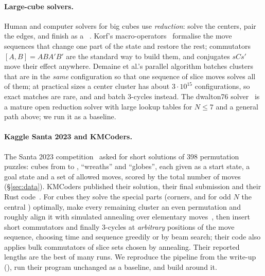 \paragraph{Large-cube solvers.}
Human and computer solvers for big cubes use \emph{reduction}: solve the centers, pair the edges, and finish
as a ~\cite{walton2017nxnxn}. Korf's macro-operators~\cite{korf1985macro} formalise the move sequences
that change one part of the state and restore the rest; commutators $[A,B]=ABA'B'$ are the standard way to
build them, and conjugates $sCs'$ move their effect anywhere. Demaine et al.'s parallel algorithm batches
clusters that are in the \emph{same} configuration so that one sequence of slice moves solves all of them;
at practical sizes a center cluster has about $3\cdot10^{15}$ configurations, so exact matches are rare, and
\Mthree and \FiveC batch 3-cycles instead. The dwalton76 solver~\cite{walton2017nxnxn} is a mature open
reduction solver with large lookup tables for $N\le7$ and a general path above; we run it as a baseline.

\paragraph{Kaggle Santa 2023 and KMCoders.}
The Santa 2023 competition~\cite{kaggle2023santa} asked for short solutions of 398 permutation puzzles: cubes
from  to , ``wreaths'' and ``globes'', each given as a start state, a goal state and a set of
allowed moves, scored by the total number of moves (\S\ref{sec:data}). KMCoders published their solution,
their final submission and their Rust code~\cite{kmcoders2024santa}. For cubes they solve the special parts
(corners, and for odd $N$ the central ) optimally, make every remaining cluster an even permutation and
roughly align it with simulated annealing over elementary moves~\cite{kirkpatrick1983annealing}, then insert
short commutators and finally 3-cycles at \emph{arbitrary} positions of the move sequence, choosing time and
sequence greedily or by beam search; their code also applies bulk commutators of slice sets chosen by
annealing. Their reported lengths are the best of many runs. We reproduce the pipeline from the write-up
(\Msix), run their program unchanged as a baseline, and build \Mseven around it.

